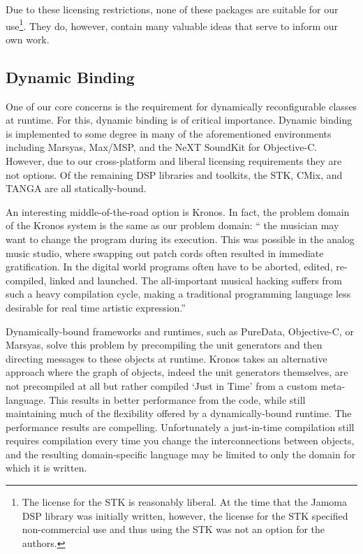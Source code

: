 \documentclass[twoside,10pt]{article}
\begin{document}
Due to these licensing restrictions, none of these packages are suitable for our use\footnote{The license for the STK is reasonably liberal.  At the time that the Jamoma DSP library was initially written, however, the license for the STK specified non-commercial use and thus using the STK was not an option for the authors.}.  They do, however, contain many valuable ideas that serve to inform our own work.



\subsection{Dynamic Binding} %

One of our core concerns is the requirement for dynamically reconfigurable classes at runtime.  For this, dynamic binding is of critical importance.  Dynamic binding is implemented to some degree in many of the aforementioned environments including Marsyas, Max/MSP, and the NeXT SoundKit for Objective-C.  However, due to our cross-platform and liberal licensing requirements they are not options.  Of the remaining DSP libraries and toolkits, the STK\cite{Cook:1999}, CMix\cite{Lansky:1990}, and TANGA\cite{Reiter:2007} are all statically-bound.  

An interesting middle-of-the-road option is Kronos.  In fact, the problem domain of the Kronos system is the same as our problem domain: `` the musician may want to change the program during its execution. This was possible in the analog music studio, where swapping out patch cords often resulted in immediate gratification. In the digital world programs often have to be aborted, edited, re- compiled, linked and launched. The all-important musical hacking suffers from such a heavy compilation cycle, making a traditional programming language less desirable for real time artistic expression.'' \cite{Norilo:2009}

Dynamically-bound frameworks and runtimes, such as PureData, Objective-C, or Marsyas, solve this problem by precompiling the unit generators and then directing messages to these objects at runtime.  Kronos takes an alternative approach where the graph of objects, indeed the unit generators themselves, are not precompiled at all but rather compiled `Just in Time' from a custom meta-language. This results in better performance from the code, while still maintaining much of the flexibility offered by a dynamically-bound runtime.  The performance results are compelling.  Unfortunately a just-in-time compilation still requires compilation every time you change the interconnections between objects, and the resulting domain-specific language may be limited to only the domain for which it is written.
\end{document}
